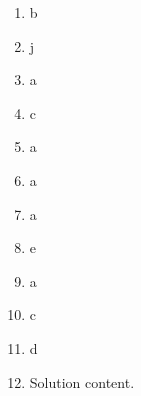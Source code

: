 \documentclass[12pt]{amsart}
\begin{document}
\begin{enumerate}[resume]
\vspace{1cm}
 \end{enumerate}\newpage\newpage{}\graphicspath{{C:/Users/iainc/anaconda3/Randomizer/Sample Course/Sample Assessment/}}\begin{enumerate}\item b\item j\item a\item c\item a\item a\item a\item e\item a\item c\item d\def \a{7}\def \atwoone{2}\def \atwotwo{-6}\def \atwothree{4}\def \btwothree{6}\def \sumtwothree{10}\def \diftwothree{-2}\def \bigtwothree{400}\def \powtwothree{1296}\def \logtwothree{0.7737056144690831}\def \factortwothree{65}\def \atwofour{1.02}\def \btwofour{1.5}\def \tooshorttwofour{10.1}\def \moneytwofour{10.10}\def \longertwofour{10.10000}\def \atwofive{0.12}\def \btwofive{0.12346}\def \athreeone{6}\def \bthreeone{5}\def \setthreetwo{[3, 7, 7]}\def \athreetwo{3}\def \bthreetwo{7}\def \cthreetwo{7}\def \controlthreethree{-8}\def \athreethree{4}\def \topthreethree{0}\def \athreefour{5}\def \bthreefour{4}\def \listthreefour{[1, 2, 3, 4]}\def \afourone{12}\def \bfourone{-8}\def \fracfourone{\frac{-3}{2}}\def \rootfourtwo{8}\def \simplifiedfourtwo{2 \sqrt{2}}\def \sqrtlistfourtwo{[2, 2]}\def \outfourtwo{2}\def \infourtwo{2}\def \wowfourtwo{1}\def \afourthree{5}\def \nicethreefour{3x^{2}-x^{}+5}\def \nastythreefour{xyz^{3}+5}\def \cfourthree{-4}\def \dfourthree{9}\def \infourthree{-4x^{}}\def \outfourthree{+9y^{}}\def \afourfour{1298054}\def \nicefourfour{1,298,054}\def \goodfourfour{1,000,000.12345}\def \badfourfour{1,000,000.1}
\item Solution content.


\end{enumerate}
\end{document}

